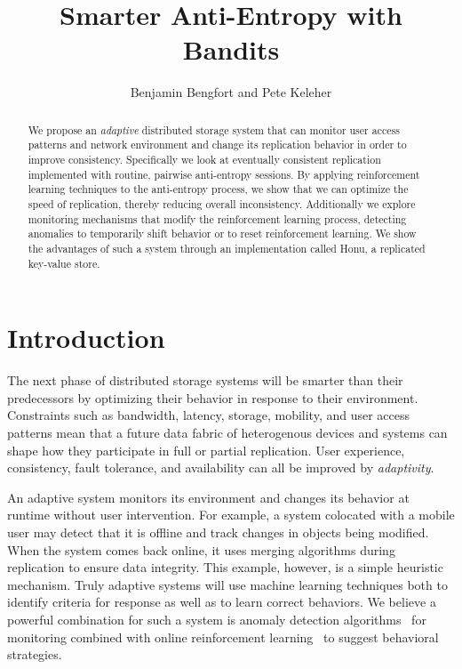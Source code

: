 \documentclass[letterpaper,11pt,onecolumn]{article}
\begin{document}
\title{\Large \bf Smarter Anti-Entropy with Bandits}
\author{Benjamin Bengfort and Pete Keleher}
\date{}
\maketitle

\begin{abstract}
We propose an \emph{adaptive} distributed storage system that can monitor
user access patterns and network environment and change its replication
behavior in order to improve consistency.
Specifically we look at eventually consistent replication implemented with
routine, pairwise anti-entropy sessions.
By applying reinforcement learning techniques to the anti-entropy process,
we show that we can optimize the speed of replication, thereby reducing
overall inconsistency.
Additionally we explore monitoring mechanisms that modify the reinforcement
learning process, detecting anomalies to temporarily shift behavior or to
reset reinforcement learning.
We show the advantages of such a system through an implementation called
Honu, a replicated key-value store.
\end{abstract}

\section*{Introduction}

The next phase of distributed storage systems will be smarter than their
predecessors by optimizing their behavior in response to their environment.
Constraints such as bandwidth, latency, storage, mobility, and user access
patterns mean that a future data fabric of heterogenous devices and systems
can shape how they participate in full or partial replication.
User experience, consistency, fault tolerance, and availability can all be
improved by \emph{adaptivity}.

An adaptive system monitors its environment and changes its behavior at
runtime without user intervention.
For example, a system colocated with a mobile user may detect that it is
offline and track changes in objects being modified.
When the system comes back online, it uses merging algorithms during
replication to ensure data integrity.
This example, however, is a simple heuristic mechanism.
Truly adaptive systems will use machine learning techniques both to identify
criteria for response as well as to learn correct behaviors.
We believe a powerful combination for such a system is anomaly
detection algorithms~\cite{angiulli_fast_2002,qian_recognition_2010} for
monitoring combined with online reinforcement
learning~\cite{osugi_balancing_2005,kalai_efficient_2005,bouneffouf_contextual_2014,langford_epoch-greedy_2008}
to suggest behavioral strategies.
\end{document}

